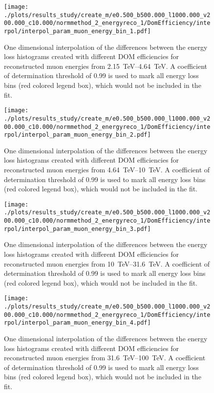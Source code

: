 \begin{figure}[H]
    \centering
    \texttt{[image: ./plots/results\_study/create\_m/e0.500\_b500.000\_l1000.000\_v200.000\_c10.000/normmethod\_2\_energyreco\_1/DomEfficiency/interpol/interpol\_param\_muon\_energy\_bin\_1.pdf]}
    \caption{One dimensional interpolation of the differences between the energy loss histograms created with different DOM efficiencies for reconstructed muon energies from \SIrange{2.15}{4.64}{TeV}. A coefficient of determination threshold of \num{0.99} is used to mark all energy loss bins (red colored legend box), which would not be included in the fit.}
    \label{fig:study_1d_interpol_mu1_nn_high_eff}
\end{figure}

\begin{figure}[H]
    \centering
    \texttt{[image: ./plots/results\_study/create\_m/e0.500\_b500.000\_l1000.000\_v200.000\_c10.000/normmethod\_2\_energyreco\_1/DomEfficiency/interpol/interpol\_param\_muon\_energy\_bin\_2.pdf]}
    \caption{One dimensional interpolation of the differences between the energy loss histograms created with different DOM efficiencies for reconstructed muon energies from \SIrange{4.64}{10}{TeV}. A coefficient of determination threshold of \num{0.99} is used to mark all energy loss bins (red colored legend box), which would not be included in the fit.}
    \label{fig:study_1d_interpol_mu2_nn_high_eff}
\end{figure}

\begin{figure}[H]
    \centering
    \texttt{[image: ./plots/results\_study/create\_m/e0.500\_b500.000\_l1000.000\_v200.000\_c10.000/normmethod\_2\_energyreco\_1/DomEfficiency/interpol/interpol\_param\_muon\_energy\_bin\_3.pdf]}
    \caption{One dimensional interpolation of the differences between the energy loss histograms created with different DOM efficiencies for reconstructed muon energies from \SIrange{10}{31.6}{TeV}. A coefficient of determination threshold of \num{0.99} is used to mark all energy loss bins (red colored legend box), which would not be included in the fit.}
    \label{fig:study_1d_interpol_mu3_nn_high_eff}
\end{figure}

\begin{figure}[H]
    \centering
    \texttt{[image: ./plots/results\_study/create\_m/e0.500\_b500.000\_l1000.000\_v200.000\_c10.000/normmethod\_2\_energyreco\_1/DomEfficiency/interpol/interpol\_param\_muon\_energy\_bin\_4.pdf]}
    \caption{One dimensional interpolation of the differences between the energy loss histograms created with different DOM efficiencies for reconstructed muon energies from \SIrange{31.6}{100}{TeV}. A coefficient of determination threshold of \num{0.99} is used to mark all energy loss bins (red colored legend box), which would not be included in the fit.}
    \label{fig:study_1d_interpol_mu4_nn_high_eff}
\end{figure}


